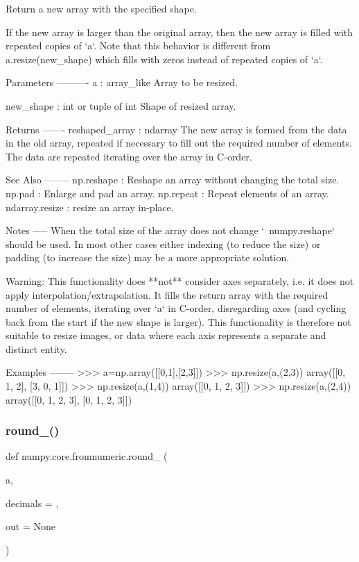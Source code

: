 \begin{DoxyVerb}Return a new array with the specified shape.

If the new array is larger than the original array, then the new
array is filled with repeated copies of `a`.  Note that this behavior
is different from a.resize(new_shape) which fills with zeros instead
of repeated copies of `a`.

Parameters
----------
a : array_like
    Array to be resized.

new_shape : int or tuple of int
    Shape of resized array.

Returns
-------
reshaped_array : ndarray
    The new array is formed from the data in the old array, repeated
    if necessary to fill out the required number of elements.  The
    data are repeated iterating over the array in C-order.

See Also
--------
np.reshape : Reshape an array without changing the total size.
np.pad : Enlarge and pad an array.
np.repeat : Repeat elements of an array.
ndarray.resize : resize an array in-place.

Notes
-----
When the total size of the array does not change `~numpy.reshape` should
be used.  In most other cases either indexing (to reduce the size)
or padding (to increase the size) may be a more appropriate solution.

Warning: This functionality does **not** consider axes separately,
i.e. it does not apply interpolation/extrapolation.
It fills the return array with the required number of elements, iterating
over `a` in C-order, disregarding axes (and cycling back from the start if
the new shape is larger).  This functionality is therefore not suitable to
resize images, or data where each axis represents a separate and distinct
entity.

Examples
--------
>>> a=np.array([[0,1],[2,3]])
>>> np.resize(a,(2,3))
array([[0, 1, 2],
       [3, 0, 1]])
>>> np.resize(a,(1,4))
array([[0, 1, 2, 3]])
>>> np.resize(a,(2,4))
array([[0, 1, 2, 3],
       [0, 1, 2, 3]])\end{DoxyVerb}
 \mbox{\label{namespacenumpy_1_1core_1_1fromnumeric_a5f56c2d021bee41046d2728b0ba05631}} 
\subsubsection{\texorpdfstring{round\+\_\+()}{round\_()}}
{\footnotesize\ttfamily def numpy.\+core.\+fromnumeric.\+round\+\_\+ (\begin{DoxyParamCaption}\item[{}]{a,  }\item[{}]{decimals = {},  }\item[{}]{out = {\ttfamily None} }\end{DoxyParamCaption})}

